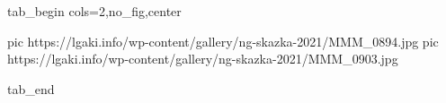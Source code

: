  
 
 
 
 


\ifcmt
  tab_begin cols=2,no_fig,center

		 pic https://lgaki.info/wp-content/gallery/ng-skazka-2021/MMM_0894.jpg
     pic https://lgaki.info/wp-content/gallery/ng-skazka-2021/MMM_0903.jpg

  tab_end
\fi
